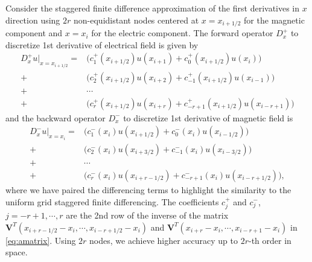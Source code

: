 \documentclass[a4paper,10pt]{article}
\begin{document}
Consider the staggered finite difference approximation of the first derivatives in $x$ direction using $2r$ non-equidistant nodes centered at $x=x_{i+1/2}$  for the magnetic component and $x=x_i$ for the electric component. The forward operator $D_x^+$ to discretize 1st derivative of electrical field is given by
\begin{equation}\label{eq:HFD1}
  \begin{split}
    D_x^+ u |_{x=x_{i+1/2}}=& \Big(c^+_1(x_{i+1/2}) u(x_{i+1}) + c^+_{0}(x_{i+1/2}) u(x_{i})\Big) \\
    + &\Big(c^+_2(x_{i+1/2}) u(x_{i+2}) + c^+_{-1}(x_{i+1/2}) u(x_{i-1})\Big)\\
    + & \cdots \\
    + &\Big( c^+_r(x_{i+1/2}) u(x_{i+r}) + c^+_{-r+1}(x_{i+1/2}) u(x_{i-r+1})\Big)
    \end{split}
\end{equation}
and the backward operator $D_x^-$ to discretize 1st derivative of magnetic field is
\begin{equation}\label{eq:HFD2}
  \begin{split}
    D_x^- u |_{x=x_{i}}=&\Big(c^-_1(x_{i}) u(x_{i+1/2}) + c^-_0(x_{i})  u(x_{i-1/2})\Big)\\
    +&\Big(c^-_2(x_{i}) u(x_{i+3/2}) + c^-_{-1}(x_{i}) u(x_{i-3/2})\Big)\\
    +& \cdots\\
    +&\Big(c^-_r(x_{i}) u(x_{i+r-1/2}) + c^-_{-r+1}(x_{i}) u(x_{i-r+1/2})\Big),
  \end{split}
\end{equation}
where we have paired the differencing terms to highlight the similarity to the uniform grid staggered finite differencing. The coefficients $c_j^+$ and $c_j^-$, $j=-r+1,\cdots, r$ are the 2nd row of the inverse of the matrix $\mathbf{V}^T(x_{i+r-1/2}-x_i,\cdots,x_{i-r+1/2}-x_i)$ and $\mathbf{V}^T(x_{i+r}-x_i,\cdots,x_{i-r+1}-x_i)$ in \eqref{eq:amatrix}.  Using $2r$ nodes, we achieve higher accuracy up to $2r$-th order in space.
\end{document}
